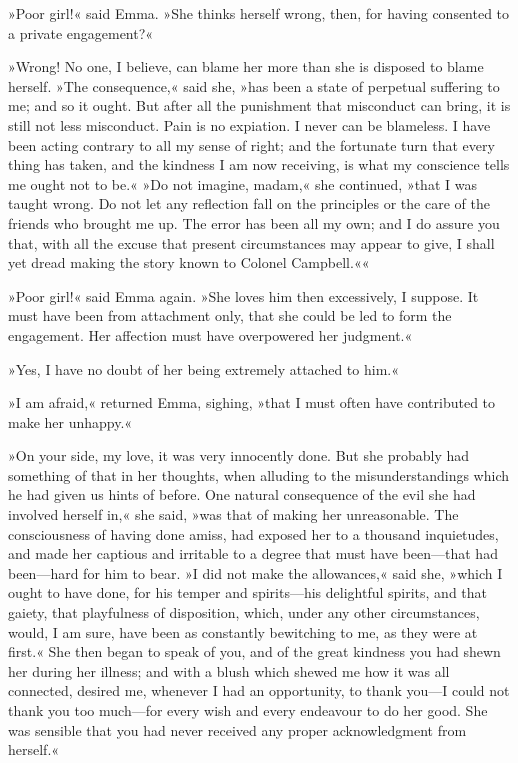 »Poor girl!« said Emma. »She thinks herself wrong, then, for having consented to a private engagement?«

»Wrong! No one, I believe, can blame her more than she is disposed to blame herself. »The consequence,« said she, »has been a state of perpetual suffering to me; and so it ought. But after all the punishment that misconduct can bring, it is still not less misconduct. Pain is no expiation. I never can be blameless. I have been acting contrary to all my sense of right; and the fortunate turn that every thing has taken, and the kindness I am now receiving, is what my conscience tells me ought not to be.« »Do not imagine, madam,« she continued, »that I was taught wrong. Do not let any reflection fall on the principles or the care of the friends who brought me up. The error has been all my own; and I do assure you that, with all the excuse that present circumstances may appear to give, I shall yet dread making the story known to Colonel Campbell.««

»Poor girl!« said Emma again. »She loves him then excessively, I suppose. It must have been from attachment only, that she could be led to form the engagement. Her affection must have overpowered her judgment.«

»Yes, I have no doubt of her being extremely attached to him.«

»I am afraid,« returned Emma, sighing, »that I must often have contributed to make her unhappy.«

»On your side, my love, it was very innocently done. But she probably had something of that in her thoughts, when alluding to the misunderstandings which he had given us hints of before. One natural consequence of the evil she had involved herself in,« she said, »was that of making her unreasonable. The consciousness of having done amiss, had exposed her to a thousand inquietudes, and made her captious and irritable to a degree that must have been—that had been—hard for him to bear. »I did not make the allowances,« said she, »which I ought to have done, for his temper and spirits—his delightful spirits, and that gaiety, that playfulness of disposition, which, under any other circumstances, would, I am sure, have been as constantly bewitching to me, as they were at first.« She then began to speak of you, and of the great kindness you had shewn her during her illness; and with a blush which shewed me how it was all connected, desired me, whenever I had an opportunity, to thank you—I could not thank you too much—for every wish and every endeavour to do her good. She was sensible that you had never received any proper acknowledgment from herself.«

